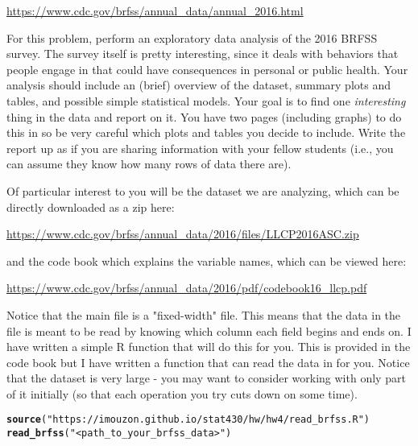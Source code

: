 \documentclass[11pt]{article}\usepackage[]{graphicx}\usepackage[]{color}
\makeatletter
\newcommand{\hlstr}[1]{\textcolor[rgb]{0.192,0.494,0.8}{#1}}%
\newcommand{\hlstd}[1]{\textcolor[rgb]{0.345,0.345,0.345}{#1}}%
\newcommand{\hlkwd}[1]{\textcolor[rgb]{0.737,0.353,0.396}{\textbf{#1}}}%
\newenvironment{kframe}{%
 \def\at@end@of@kframe{}%
 \ifinner\ifhmode%
  \def\at@end@of@kframe{\end{minipage}}%
  \begin{minipage}{\columnwidth}%
 \fi\fi%
 \def\FrameCommand##1{\hskip\@totalleftmargin \hskip-\fboxsep
 \colorbox{shadecolor}{##1}\hskip-\fboxsep
     \hskip-\linewidth \hskip-\@totalleftmargin \hskip\columnwidth}%
 \MakeFramed {\advance\hsize-\width
   \@totalleftmargin\z@ \linewidth\hsize
   \@setminipage}}%
 {\par\unskip\endMakeFramed%
 \at@end@of@kframe}
\newenvironment{knitrout}{}{} %
\makeatother
\begin{document}
\begin{enumerate}
\url{https://www.cdc.gov/brfss/annual_data/annual_2016.html}

For this problem, perform an exploratory data analysis of the 2016 BRFSS survey. The survey itself is pretty interesting, since it deals with behaviors that people engage in that could have consequences in personal or public health. Your analysis should include an (brief) overview of the dataset, summary plots and tables, and possible simple statistical models. Your goal is to find one \textit{interesting} thing in the data and report on it. You have two pages (including graphs) to do this in so be very careful which plots and tables you decide to include. Write the report up as if you are sharing information with your fellow students (i.e., you can assume they know how many rows of data there are).

Of particular interest to you will be the dataset we are analyzing, which can be directly downloaded as a zip here:

\url{https://www.cdc.gov/brfss/annual_data/2016/files/LLCP2016ASC.zip}

and the code book which explains the variable names, which can be viewed here:

\url{https://www.cdc.gov/brfss/annual_data/2016/pdf/codebook16_llcp.pdf}

Notice that the main file is a "fixed-width" file. This means that the data in the file is meant to be read by knowing which column each field begins and ends on. I have written a simple R function that will do this for you. This is provided in the code book but I have written a function that can read the data in for you. Notice that the dataset is very large - you may want to consider working with only part of it initially (so that each operation you try cuts down on some time).

\begin{knitrout}
\color{fgcolor}\begin{kframe}
\begin{alltt}
\hlkwd{source}\hlstd{(}\hlstr{"https://imouzon.github.io/stat430/hw/hw4/read_brfss.R"}\hlstd{)}
\hlkwd{read_brfss}\hlstd{(}\hlstr{"<path_to_your_brfss_data>"}\hlstd{)}
\end{alltt}
\end{kframe}
\end{knitrout}

\end{enumerate}
\end{document}
